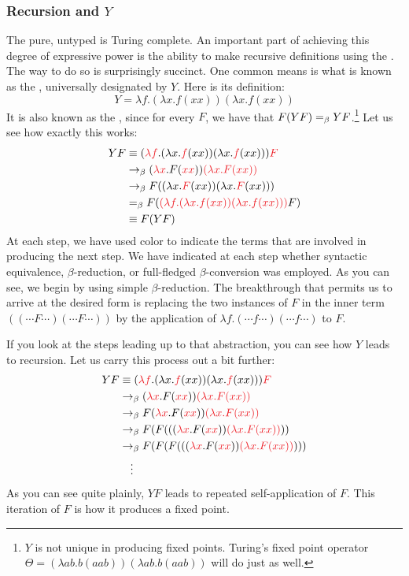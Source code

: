 \subsubsection{Recursion and $Y$}\label{untyped:y}
The pure, untyped \lambdacalc is Turing complete. An important part of achieving this degree of expressive power is the ability to make recursive definitions using the \lambdacalc{}. The way to do so is surprisingly succinct. One common means is what is known as the , universally designated by $Y$. Here is its definition:
\[
Y = \lambda f. (\lambda x.f(xx))(\lambda x.f(xx))
\]
It is also known as the , since for every $F$, we have that $F(YF) =_{\beta} YF$.\footnote{$Y$ is not unique in producing fixed points. Turing's fixed point operator $\Theta = (\lambda a b . b (aab)) (\lambda a b . b (aab))$ will do just as well.} Let us see how exactly this works:
\begin{align*}
Y F &\equiv (\redex{\lambda f}. (\lambda x.\redex{f}(xx))(\lambda x.\redex{f}(xx))) \redex{F} \\
&\betared (\redex{\lambda x}. F(\redex{x}\redex{x})) \redex{(\lambda x. F(xx))}\\
&\betared F ( (\lambda x. \redex{F}(xx)) (\lambda x. \redex{F}(xx)) )\\
&\betacon F (\redex{(\lambda f. (\lambda x.f(xx))(\lambda x.f(xx)))} F)\\
&\equiv F (Y F)
\end{align*}
At each step, we have used color to indicate the terms that are involved in producing the next step. We have indicated at each step whether syntactic equivalence, $\beta$-reduction, or full-fledged $\beta$-conversion was employed. As you can see, we begin by using simple $\beta$-reduction. The breakthrough that permits us to arrive at the desired form is replacing the two instances of $F$ in the inner term $((\dotsb F \dotsb)(\dotsb F \dotsb))$ by the application of $\lambda f. (\dotsb f \dotsb)(\dotsb f \dotsb)$ to $F$.

If you look at the steps leading up to that abstraction, you can see how $Y$ leads to recursion. Let us carry this process out a bit further:
\begin{align*}
Y F &\equiv (\redex{\lambda f}. (\lambda x.\redex{f}(xx))(\lambda x.\redex{f}(xx))) \redex{F} \\
&\betared (\redex{\lambda x}. F(\redex{x}\redex{x})) \redex{(\lambda x. F(xx))}\\
&\betared F (\redex{\lambda x}. F(\redex{x}\redex{x})) \redex{(\lambda x. F(xx))}\\
&\betared F ( F ( ((\redex{\lambda x}. F(\redex{x}\redex{x})) \redex{(\lambda x. F(xx))} ))\\
&\betared F ( F ( F ( ((\redex{\lambda x}. F(\redex{x}\redex{x})) \redex{(\lambda x. F(xx))} )))\\
&\hphantom{\rightarrow}\vdots
\end{align*}
As you can see quite plainly, $YF$ leads to repeated self-application of $F$. This iteration of $F$ is how it produces a fixed point.%

